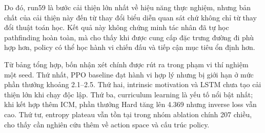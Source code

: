 Do đó, run59 là bước cải thiện lớn nhất về hiệu năng thực nghiệm, nhưng bản chất của cải thiện này đến từ thay đổi biểu diễn quan sát chứ không chỉ từ thay đổi thuật toán học. Kết quả này không chứng minh tác nhân đã tự học pathfinding hoàn toàn, mà cho thấy khi được cung cấp đặc trưng đường đi phù hợp hơn, policy có thể học hành vi chiến đấu và tiếp cận mục tiêu ổn định hơn.

Từ bảng tổng hợp, bốn nhận xét chính được rút ra trong phạm vi thí nghiệm một seed. Thứ nhất, PPO baseline đạt hành vi hợp lý nhưng bị giới hạn ở mức phần thưởng khoảng 2.1--2.5. Thứ hai, intrinsic motivation và LSTM chưa tạo cải thiện lớn khi chạy độc lập. Thứ ba, curriculum learning là yếu tố nổi bật nhất; khi kết hợp thêm ICM, phần thưởng Hard tăng lên 4.369 nhưng inverse loss vẫn cao. Thứ tư, entropy plateau vẫn tồn tại trong nhóm ablation chính 207 chiều, cho thấy cần nghiên cứu thêm về action space và cấu trúc policy.

